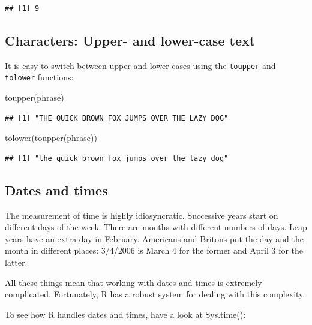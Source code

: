 \documentclass[
]{book}
\newenvironment{Shaded}{\begin{snugshade}}{\end{snugshade}}
\newcommand{\FunctionTok}[1]{\textcolor[rgb]{0.00,0.00,0.00}{#1}}
\newcommand{\NormalTok}[1]{#1}
\begin{document}
\begin{verbatim}
## [1] 9
\end{verbatim}

\hypertarget{characters-upper--and-lower-case-text}{%
\subsection{Characters: Upper- and lower-case text}\label{characters-upper--and-lower-case-text}}

It is easy to switch between upper and lower cases using the \texttt{toupper} and \texttt{tolower} functions:

\begin{Shaded}
\begin{Highlighting}[]
\FunctionTok{toupper}\NormalTok{(phrase)}
\end{Highlighting}
\end{Shaded}

\begin{verbatim}
## [1] "THE QUICK BROWN FOX JUMPS OVER THE LAZY DOG"
\end{verbatim}

\begin{Shaded}
\begin{Highlighting}[]
\FunctionTok{tolower}\NormalTok{(}\FunctionTok{toupper}\NormalTok{(phrase))}
\end{Highlighting}
\end{Shaded}

\begin{verbatim}
## [1] "the quick brown fox jumps over the lazy dog"
\end{verbatim}

\hypertarget{dates-and-times}{%
\subsection{Dates and times}\label{dates-and-times}}

The measurement of time is highly idiosyncratic. Successive years start on different days of the week. There are months with different numbers of days. Leap years have an extra day in February. Americans and Britons put the day and the month in different places: 3/4/2006 is March 4 for the former and April 3 for the latter.

All these things mean that working with dates and times is extremely complicated. Fortunately, R has a robust system for dealing with this complexity.

To see how R handles dates and times, have a look at Sys.time():
\end{document}
